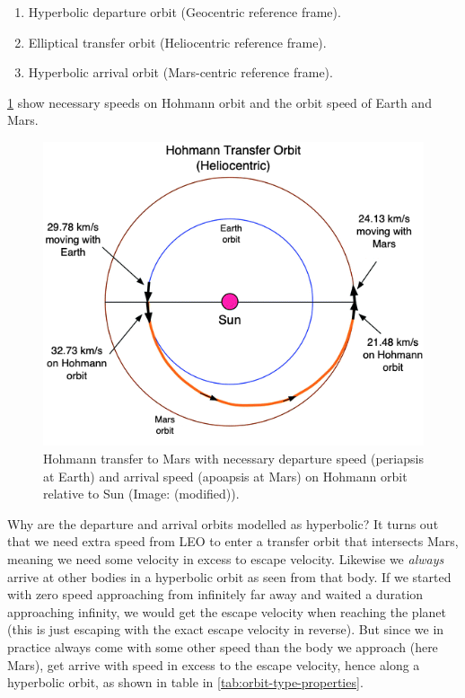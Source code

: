 \begin{enumerate}
	\item Hyperbolic departure orbit (Geocentric reference frame).
	\item Elliptical transfer orbit (Heliocentric reference frame).
	\item Hyperbolic arrival orbit (Mars-centric reference frame).
\end{enumerate}

\cref{fig:Hohmann-to-mars-heliocentric} show necessary speeds on Hohmann orbit and the orbit speed of Earth and Mars. 

\begin{figure}[ht]
    \centering
    \includegraphics[width=0.7\linewidth]{fig/Hohmann-to-mars-heliocentric.png}
    \caption{Hohmann transfer to Mars with necessary departure speed (periapsis at Earth) and arrival speed (apoapsis at Mars) on Hohmann orbit relative to Sun (Image: \cite[p.~127]{Rapp2016} (modified)).}
    \label{fig:Hohmann-to-mars-heliocentric}
\end{figure}


Why are the departure and arrival orbits modelled as hyperbolic? It turns out that we need extra speed from LEO to enter a transfer orbit that intersects Mars, meaning we need some velocity in excess to escape velocity. Likewise we \emph{always} arrive at other bodies in a hyperbolic orbit as seen from that body. If we started with zero speed approaching from infinitely far away and waited a duration approaching infinity, we would get the escape velocity when reaching the planet (this is just escaping with the exact escape velocity in reverse). But since we in practice always come with some other speed than the body we approach (here Mars), get arrive with speed in excess to the escape velocity, hence along a hyperbolic orbit, as shown in table in \cref{tab:orbit-type-properties}.

